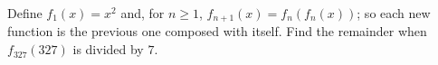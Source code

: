 Define $f_1(x)=x^2$ and, for $n\ge1$, $f_{n+1}(x)=f_n\left(f_n(x)\right)$; so each new function is the previous one composed with itself. Find the remainder when $f_{327}(327)$ is divided by $7$.
